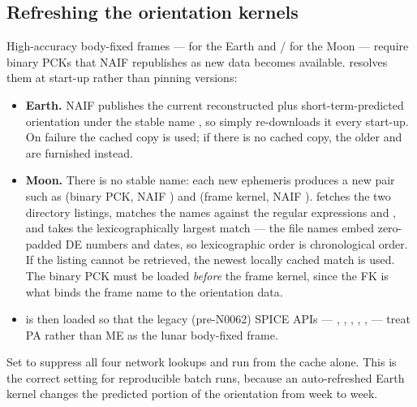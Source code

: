 \subsection{Refreshing the orientation kernels}
\label{sec:sp3-orientation}

High-accuracy body-fixed frames ---  for the Earth and
/ for the Moon --- require binary
PCKs that NAIF republishes as new data becomes available. \lupnt{} resolves
them at start-up rather than pinning versions:

\begin{itemize}[leftmargin=1.4em]
  \item \textbf{Earth.} NAIF publishes the current reconstructed plus
    short-term-predicted orientation under the stable name
    , so  simply
    re-downloads it every start-up. On failure the cached copy is used; if
    there is no cached copy, the older
     and
     are furnished instead.
  \item \textbf{Moon.} There is no stable name: each new ephemeris produces a
    new pair such as  (binary PCK, NAIF
    ) and  (frame kernel, NAIF
    ). \lupnt{} fetches the two directory listings,
    matches the names against the regular expressions
     and
    , and takes
    the lexicographically largest match --- the file names embed zero-padded DE
    numbers and dates, so lexicographic order is chronological order. If the
    listing cannot be retrieved, the newest locally cached match is used. The
    binary PCK must be loaded \emph{before} the frame kernel, since the FK is
    what binds the frame name to the orientation data.
  \item {} is then loaded so that the legacy
    (pre-N0062) SPICE APIs --- , , ,
    , ,  --- treat PA rather than ME as
    the lunar body-fixed frame.
\end{itemize}

Set  to suppress all four network
lookups and run from the cache alone. This is the correct setting for
reproducible batch runs, because an auto-refreshed Earth kernel changes the
predicted portion of the orientation from week to week.

